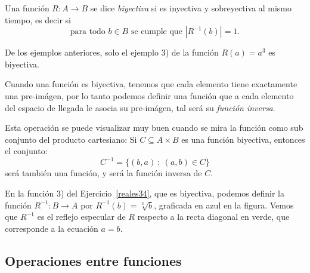 \hspace{.5cm}

\begin{defn}
Una función  $R:A\rightarrow B$ se dice \emph{biyectiva} si es inyectiva y sobreyectiva al mismo tiempo, es decir si
$$\textrm{para todo } b\in B \textrm{ se cumple que }|R^{-1}(b)|= 1.$$
\end{defn}

De los ejemplos anteriores, solo el ejemplo 3) de la función $R(a)=a^3$ es biyectiva.

Cuando una función es biyectiva, tenemos que cada elemento tiene exactamente una pre-imágen, por lo tanto podemos definir una función que a cada elemento del espacio de llegada le asocia su pre-imágen, tal será su \emph{función inversa}. 

Esta operación se puede visualizar muy buen cuando se mira la función como sub conjunto del producto cartesiano: Si $C\subseteq A\times B$ es una función biyectiva, entonces el conjunto:
$$ C^{-1}=\{(b,a)\ :\ (a,b)\in C\}$$
será también una función, y será la función inversa de $C$.

\hspace{.2cm}


\begin{ejemplo}
En la función 3) del Ejercicio~\ref{reales34}, que es biyectiva, podemos definir la función $R^{-1}: B\rightarrow A$ por $R^{-1}(b)=\sqrt[3]{b}$, graficada en azul en la figura.
Vemos que $R^{-1}$ es el reflejo especular de $R$ respecto a la recta diagonal en verde, que corresponde a la ecuación $a=b$.

\begin{center}
\end{center}
\end{ejemplo}


\subsection{Operaciones entre funciones}

